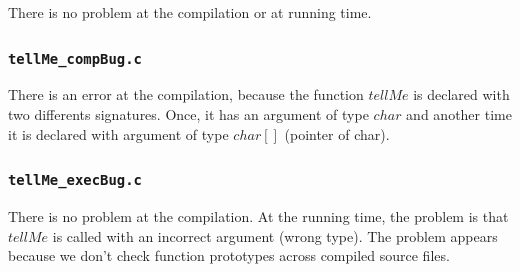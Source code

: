 \documentclass[a4paper,11pt]{report}
\begin{document}
There is no problem at the compilation or at running time.

\subsubsection{\texttt{tellMe\_compBug.c}}

There is an error at the compilation, because the function $tellMe$ is declared
with two differents signatures. Once, it has an argument of type $char$ and
another time it is declared with argument of type $char[]$ (pointer of char).

\subsubsection{\texttt{tellMe\_execBug.c}}

There is no problem at the compilation. At the running time, the problem is that
$tellMe$ is called with an incorrect argument (wrong type). The problem appears
because we don't check function prototypes across compiled source files.
\end{document}
